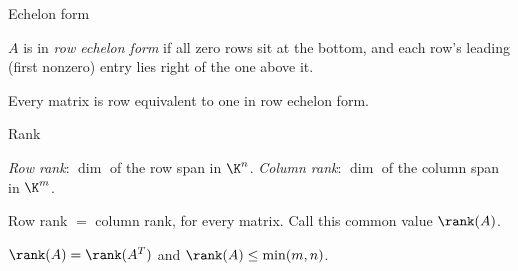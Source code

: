 \begin{frame}{Echelon form}
\begin{definition}
$A$ is in \emph{row echelon form} if all zero rows sit at the bottom, and each row's leading (first nonzero)
entry lies right of the one above it.
\end{definition}

\pause

\begin{fact}
Every matrix is row equivalent to one in row echelon form.
\end{fact}

\pause

\begin{steps}
\end{steps}
\end{frame}

\begin{frame}{Rank}
\begin{definition}
\emph{Row rank}: $\dim$ of the row span in $\K^n$. \emph{Column rank}: $\dim$ of the column span in $\K^m$.
\end{definition}

\pause

\begin{theorem}
Row rank $=$ column rank, for every matrix. Call this common value $\rank(A)$.
\end{theorem}

\pause

\begin{fact}
$\rank(A)=\rank(A^T)$ and $\rank(A)\leq\min(m,n)$.
\end{fact}
\end{frame}

